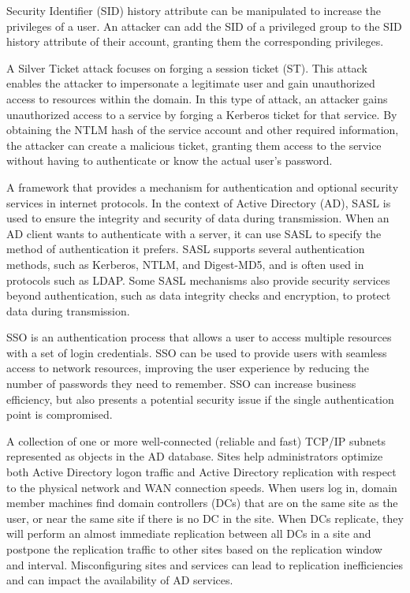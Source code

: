  Security Identifier (SID) history attribute can be manipulated to increase the privileges of a user. An attacker can add the SID of a privileged group to the SID history attribute of their account, granting them the corresponding privileges.

 A Silver Ticket attack focuses on forging a session ticket (ST). This attack enables the attacker to impersonate a legitimate user and gain unauthorized access to resources within the domain. In this type of attack, an attacker gains unauthorized access to a service by forging a Kerberos ticket for that service. By obtaining the NTLM hash of the service account and other required information, the attacker can create a malicious ticket, granting them access to the service without having to authenticate or know the actual user’s password.

 A framework that provides a mechanism for authentication and optional security services in internet protocols. In the context of Active Directory (AD), SASL is used to ensure the integrity and security of data during transmission. When an AD client wants to authenticate with a server, it can use SASL to specify the method of authentication it prefers. SASL supports several authentication methods, such as Kerberos, NTLM, and Digest-MD5, and is often used in protocols such as LDAP. Some SASL mechanisms also provide security services beyond authentication, such as data integrity checks and encryption, to protect data during transmission.

 SSO is an authentication process that allows a user to access multiple resources with a set of login credentials. SSO can be used to provide users with seamless access to network resources, improving the user experience by reducing the number of passwords they need to remember. SSO can increase business efficiency, but also presents a potential security issue if the single authentication point is compromised.

 A collection of one or more well-connected (reliable and fast) TCP/IP subnets represented as objects in the AD database. Sites help administrators optimize both Active Directory logon traffic and Active Directory replication with respect to the physical network and WAN connection speeds. When users log in, domain member machines find domain controllers (DCs) that are on the same site as the user, or near the same site if there is no DC in the site. When DCs replicate, they will perform an almost immediate replication between all DCs in a site and postpone the replication traffic to other sites based on the replication window and interval. Misconfiguring sites and services can lead to replication inefficiencies and can impact the availability of AD services.

